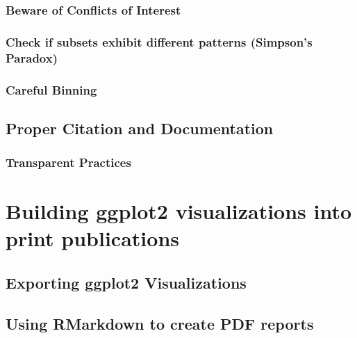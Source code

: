 \documentclass[
]{krantz}
\begin{document}
\hypertarget{beware-of-conflicts-of-interest}{%
\subsection{Beware of Conflicts of Interest}\label{beware-of-conflicts-of-interest}}

\hypertarget{check-if-subsets-exhibit-different-patterns-simpsons-paradox}{%
\subsection{Check if subsets exhibit different patterns (Simpson's Paradox)}\label{check-if-subsets-exhibit-different-patterns-simpsons-paradox}}

\hypertarget{careful-binning}{%
\subsection{Careful Binning}\label{careful-binning}}

\hypertarget{proper-citation-and-documentation}{%
\section{Proper Citation and Documentation}\label{proper-citation-and-documentation}}

\hypertarget{transparent-practices}{%
\subsection{Transparent Practices}\label{transparent-practices}}

\hypertarget{print-publications}{%
\chapter{Building ggplot2 visualizations into print publications}\label{print-publications}}

\hypertarget{exporting-ggplot2-visualizations}{%
\section{Exporting ggplot2 Visualizations}\label{exporting-ggplot2-visualizations}}

\hypertarget{using-rmarkdown-to-create-pdf-reports}{%
\section{Using RMarkdown to create PDF reports}\label{using-rmarkdown-to-create-pdf-reports}}
\end{document}
